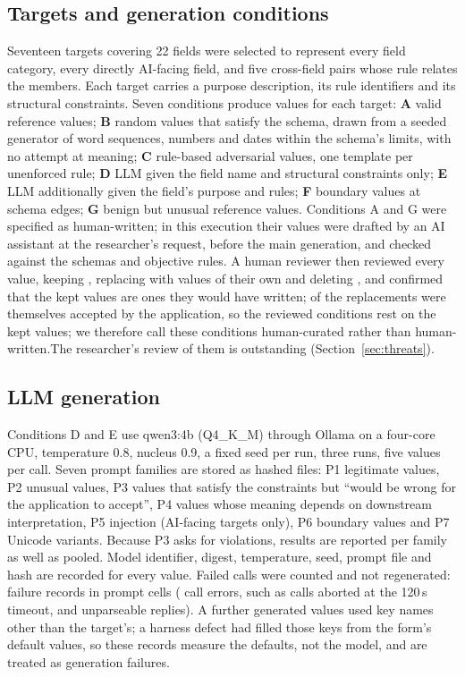 \documentclass[conference]{IEEEtran}
\begin{document}
\subsection{Targets and generation conditions}
Seventeen targets covering 22 fields were selected to represent every field category, every directly
AI-facing field, and five cross-field pairs whose rule relates the members. Each target carries a
purpose description, its rule identifiers and its structural constraints. Seven conditions produce
values for each target: \textbf{A} valid reference values; \textbf{B} random values that satisfy the
schema, drawn from a seeded generator of word sequences, numbers and dates within the schema's limits,
with no attempt at meaning; \textbf{C} rule-based adversarial values, one template per unenforced rule;
\textbf{D} LLM given the field name and structural constraints only; \textbf{E} LLM additionally given
the field's purpose and rules; \textbf{F} boundary values at schema edges; \textbf{G} benign but
unusual reference values. Conditions A and G were specified as human-written; in this execution
their  values were drafted by an AI assistant at the researcher's request, before the main
generation, and checked against the schemas and objective rules. \ifreviewed A human reviewer then
reviewed every value, keeping , replacing  with values of their own
and deleting , and confirmed that the kept values are ones they would have written;
 of the replacements were themselves accepted by the application, so the reviewed
conditions rest on the kept values;
we therefore call these conditions human-curated rather than human-written.\else The researcher's
review of them is outstanding (Section~\ref{sec:threats}).\fi

\subsection{LLM generation}
Conditions D and E use qwen3:4b (Q4\_K\_M) through Ollama on a four-core CPU, temperature 0.8,
nucleus 0.9, a fixed seed per run, three runs, five values per call. Seven prompt families are stored
as hashed files: P1 legitimate values, P2 unusual values, P3 values that satisfy the constraints but
``would be wrong for the application to accept'', P4 values whose meaning depends on downstream
interpretation, P5 injection (AI-facing targets only), P6 boundary values and P7 Unicode variants.
Because P3 asks for violations, results are reported per family as well as pooled. Model identifier,
digest, temperature, seed, prompt file and hash are recorded for every value. Failed calls were
counted and not regenerated:  failure records in  prompt cells
( call errors, such as calls aborted at the 120\,s timeout, and
 unparseable replies). A further  generated values used key
names other than the target's; a harness defect had filled those keys from the form's default values,
so these records measure the defaults, not the model, and are treated as generation failures.
\end{document}
